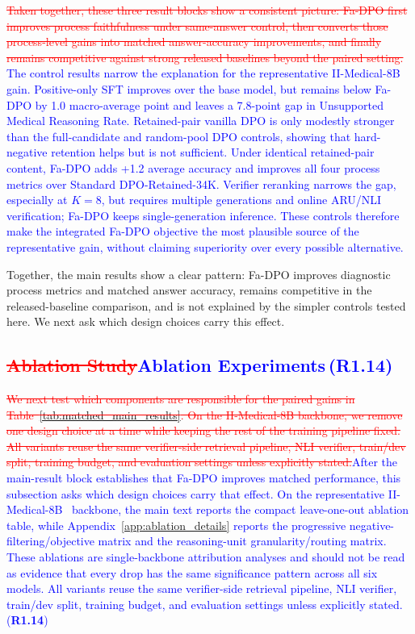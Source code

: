 \documentclass[a4paper,fleqn,doubleblind]{cas-sc}
\DeclareRobustCommand{\deleted}[1]{\textcolor{red}{\sout{#1}}}
\DeclareRobustCommand{\added}[1]{\textcolor{blue}{#1}}
\DeclareRobustCommand{\revtag}[1]{\textcolor{blue}{\scriptsize\,(\textbf{#1})}}
\begin{document}
\deleted{Taken together, these three result blocks show a consistent picture: Fa-DPO first improves process faithfulness under same-answer control, then converts those process-level gains into matched answer-accuracy improvements, and finally remains competitive against strong released baselines beyond the paired setting.}
\added{The control results narrow the explanation for the representative II-Medical-8B gain. Positive-only SFT improves over the base model, but remains below Fa-DPO by 1.0 macro-average point and leaves a 7.8-point gap in Unsupported Medical Reasoning Rate. Retained-pair vanilla DPO is only modestly stronger than the full-candidate and random-pool DPO controls, showing that hard-negative retention helps but is not sufficient. Under identical retained-pair content, Fa-DPO adds +1.2 average accuracy and improves all four process metrics over Standard DPO-Retained-34K. Verifier reranking narrows the gap, especially at $K=8$, but requires multiple generations and online ARU/NLI verification; Fa-DPO keeps single-generation inference. These controls therefore make the integrated Fa-DPO objective the most plausible source of the representative gain, without claiming superiority over every possible alternative.}

\noindent Together, the main results show a clear pattern: Fa-DPO improves diagnostic process metrics and matched answer accuracy, remains competitive in the released-baseline comparison, and is not explained by the simpler controls tested here. We next ask which design choices carry this effect.

\subsection{\deleted{Ablation Study}\added{Ablation Experiments}\revtag{R1.14}}
\label{sec:ablation}

\deleted{We next test which components are responsible for the paired gains in Table~\ref{tab:matched_main_results}. On the II-Medical-8B backbone, we remove one design choice at a time while keeping the rest of the training pipeline fixed. All variants reuse the same verifier-side retrieval pipeline, NLI verifier, train/dev split, training budget, and evaluation settings unless explicitly stated.}\added{After the main-result block establishes that Fa-DPO improves matched performance, this subsection asks which design choices carry that effect. On the representative II-Medical-8B~\cite{intelligentinternet2025iimedical8b} backbone, the main text reports the compact leave-one-out ablation table, while Appendix~\ref{app:ablation_details} reports the progressive negative-filtering/objective matrix and the reasoning-unit granularity/routing matrix. These ablations are single-backbone attribution analyses and should not be read as evidence that every drop has the same significance pattern across all six models. All variants reuse the same verifier-side retrieval pipeline, NLI verifier, train/dev split, training budget, and evaluation settings unless explicitly stated.}\revtag{R1.14}
\end{document}
